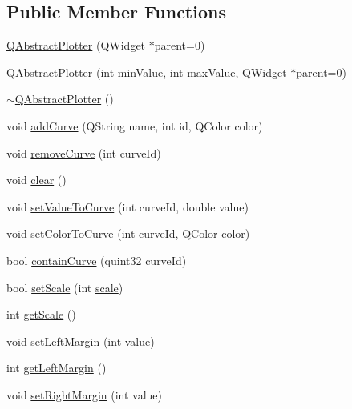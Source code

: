 \subsection*{Public Member Functions}
\begin{DoxyCompactItemize}
\item 
\hyperlink{class_q_abstract_plotter_a749f7ea5fffb0278373230ddfa0b2c54}{Q\+Abstract\+Plotter} (Q\+Widget $\ast$parent=0)
\item 
\hyperlink{class_q_abstract_plotter_a6115a06d048ba7f14d20065446d11179}{Q\+Abstract\+Plotter} (int min\+Value, int max\+Value, Q\+Widget $\ast$parent=0)
\item 
\hyperlink{class_q_abstract_plotter_a16bd244ab2b99903022904ec3ac9ce64}{$\sim$\+Q\+Abstract\+Plotter} ()
\item 
void \hyperlink{class_q_abstract_plotter_afb2443702380dd02820bcd16eb56887e}{add\+Curve} (Q\+String name, int id, Q\+Color color)
\item 
void \hyperlink{class_q_abstract_plotter_af28007660c44d8cdf51bf053f66dfb29}{remove\+Curve} (int curve\+Id)
\item 
void \hyperlink{class_q_abstract_plotter_ae0dcf382f418e762e5a0d36969ddd682}{clear} ()
\item 
void \hyperlink{class_q_abstract_plotter_ae0d6efff673eb00025e011ac99f5c2c5}{set\+Value\+To\+Curve} (int curve\+Id, double value)
\item 
void \hyperlink{class_q_abstract_plotter_abbad97040f10c7d223eb5775498bb840}{set\+Color\+To\+Curve} (int curve\+Id, Q\+Color color)
\item 
bool \hyperlink{class_q_abstract_plotter_aa85ed6da6eca4f39dbeff5374d05a509}{contain\+Curve} (quint32 curve\+Id)
\item 
bool \hyperlink{class_q_abstract_plotter_a7fcf182d5da5c88c2fc629ab8e16edc0}{set\+Scale} (int \hyperlink{class_q_abstract_plotter_aa01fe966220b24f5d63de9fa46e7b53d}{scale})
\item 
int \hyperlink{class_q_abstract_plotter_aab8c4860fbc4fbcad1f4a829c2e92a72}{get\+Scale} ()
\item 
void \hyperlink{class_q_abstract_plotter_a3f27beffdcdc9ef1a713877d1762665a}{set\+Left\+Margin} (int value)
\item 
int \hyperlink{class_q_abstract_plotter_add3f786cf9f3fafdb96c29158f93551f}{get\+Left\+Margin} ()
\item 
void \hyperlink{class_q_abstract_plotter_aa25ce3543a7b335b5195d1e4d730a9ce}{set\+Right\+Margin} (int value)
\item 

\end{DoxyCompactItemize}
